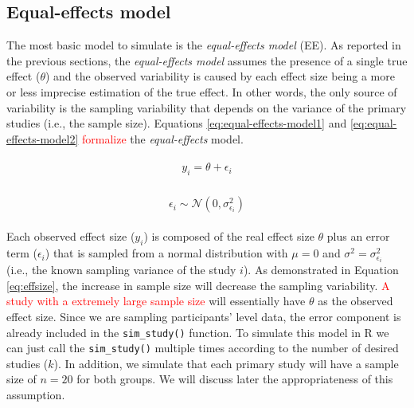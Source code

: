 \documentclass[
  man,floatsintext]{apa6}
\begin{document}
\normalsize

\hypertarget{equal-effects-model}{%
\subsection{Equal-effects model}\label{equal-effects-model}}

The most basic model to simulate is the \emph{equal-effects model} (EE). As reported in the previous sections, the \emph{equal-effects model} assumes the presence of a single true effect (\(\theta\)) and the \color{red} observed variability is caused by each effect size being a more or less imprecise estimation of the true effect. \color{black} In other words, the only source of variability is the sampling variability that depends on the variance of the primary studies (i.e., the sample size). Equations \eqref{eq:equal-effects-model1} and \eqref{eq:equal-effects-model2} \textcolor{red}{formalize} the \emph{equal-effects} model.

\begin{align}
\begin{gathered}
y_i = \theta + \epsilon_i
\label{eq:equal-effects-model1}
\end{gathered}
\end{align}

\color{black}

\begin{align}
\begin{gathered}
\epsilon_i \sim \mathcal{N}(0,\sigma_{\epsilon_i}^{2})
\label{eq:equal-effects-model2}
\end{gathered}
\end{align}

Each observed effect size \color{red} (\(y_{i}\)) \color{black} is composed of the real effect size \color{red} \(\theta\) \color{black} plus an error term (\(\epsilon_{i}\)) that is sampled from a normal distribution with \(\mu = 0\) and \color{red} \(\sigma^{2} = \sigma_{\epsilon_i}^{2}\) \color{black} (i.e., the known sampling variance of the study \(i\)). As demonstrated in Equation \eqref{eq:effsize}, the increase in sample size will decrease the sampling variability. \textcolor{red}{A study with a extremely large sample size} will essentially have \(\theta\) as the observed effect size. Since we are sampling participants' level data, the error component is already included in the \texttt{sim\_study()} function. To simulate this model in R we can just call the \texttt{sim\_study()} multiple times according to the number of desired studies (\(k\)). In addition, we simulate that each primary study will have a sample size of \(n = 20\) for both groups. We will discuss later the appropriateness of this assumption.
\end{document}
